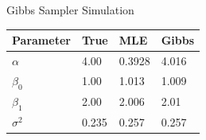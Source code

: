 \documentclass[final]{beamer}
\newlength{\sepwid}
\newlength{\onecolwid}
\newlength{\twocolwid}
\begin{document}
\begin{frame}[t]
\begin{columns}[t]
\begin{column}{\twocolwid}
\begin{columns}[t,totalwidth=\twocolwid]
\begin{column}{\onecolwid}
\begin{block}{Gibbs Sampler Simulation}
\begin{table}
\vspace{0ex}
\begin{tabular}{l l l l}
\toprule
\textbf{Parameter} & \textbf{True} & \textbf{MLE} & \textbf{Gibbs}\\
\midrule
$\alpha$ & 4.00 & 0.3928 & 4.016\\
$\beta_0$ & 1.00 & 1.013 & 1.009\\
$\beta_1$ & 2.00 & 2.006 & 2.01\\
$\sigma^2$ & 0.235 & 0.257 & 0.257\\
\bottomrule
\end{tabular}

\end{table}

\end{block}


\end{column} %

\end{columns} %

\end{column} %

\begin{column}{\sepwid}\end{column} %

\begin{column}{\onecolwid} %





\end{column}
\end{columns}
\end{frame}
\end{document}
